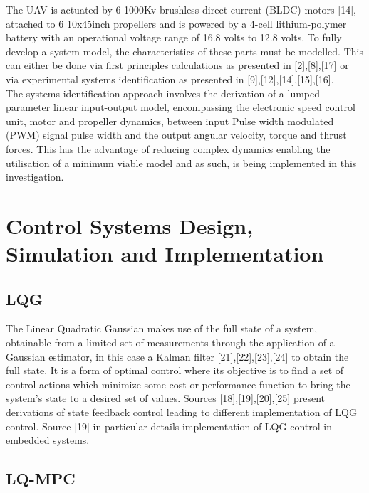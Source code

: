 \documentclass[12pt,a4paper,twoside]{report}
\begin{document}
				The UAV is actuated by 6 1000Kv brushless direct current (BLDC) motors [14], attached to 6 10x45inch propellers and is powered by a 4-cell lithium-polymer battery with an operational voltage range of 16.8 volts to 12.8 volts. To fully develop a system model, the characteristics of these parts must be modelled. This can either be done via first principles calculations as presented in [2],[8],[17] or via experimental systems identification as presented in [9],[12],[14],[15],[16]. 
				\\
				The systems identification approach involves the derivation of a lumped parameter linear input-output model, encompassing the electronic speed control unit, motor and propeller dynamics, between input Pulse width modulated (PWM) signal pulse width and the output angular velocity, torque and thrust forces. This has the advantage of reducing complex dynamics enabling the utilisation of a minimum viable model and as such, is being implemented in this investigation.
				
		\section{Control Systems Design, Simulation and Implementation}
		
			\subsection{LQG}
			
				The Linear Quadratic Gaussian makes use of the full state of a system, obtainable from a limited set of measurements through the application of a Gaussian estimator, in this case a Kalman filter [21],[22],[23],[24] to obtain the full state. It is a form of optimal control where its objective is to find a set of control actions which minimize some cost or performance function to bring the system’s state to a desired set of values. Sources [18],[19],[20],[25] present derivations of state feedback control leading to different implementation of LQG control. Source [19] in particular details implementation of LQG control in embedded systems.
				
			\subsection{LQ-MPC}
			
\end{document}

